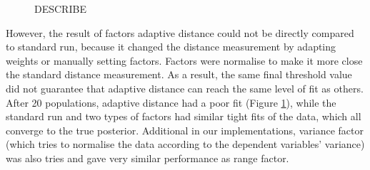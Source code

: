 \begin{figure}[t!]
    \begin{center}
    \end{center}

    \caption[Factors and adaptive distance experiments]%
    {Factors and adaptive distance experiments. Left: Total required samples. Right: acceptance rates in each generation}
    \label{fig:factor}

    \begin{center}
    \end{center}

    \caption[CAPTION]%
    {DESCRIBE}
    \label{fig:factor_sim}

\end{figure}

However, the result of factors adaptive distance could not be directly compared to standard run, because it changed the distance measurement by adapting weights or manually setting factors. Factors were normalise to make it more close the standard distance measurement. As a result, the same final threshold value did not guarantee that adaptive distance can reach the same level of fit as others. After 20 populations, adaptive distance had a poor fit (Figure \ref{fig:factor_sim}), while the standard run and two types of factors had similar tight fits of the data, which all converge to the true posterior. Additional in our implementations, variance factor (which tries to normalise the data according to the dependent variables' variance) was also tries and gave very similar performance as range factor.


